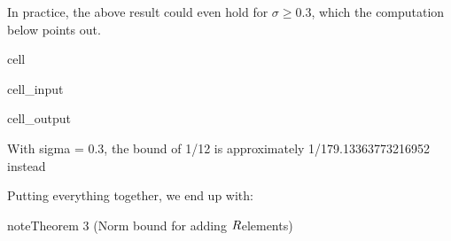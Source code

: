 \documentclass[letterpaper,10pt,english]{jupyterBook}
\begin{document}
\sphinxAtStartPar
In practice, the above result could even hold for \(\sigma \ge 0.3\), which the computation below points out.

\begin{sphinxuseclass}{cell}\begin{sphinxVerbatimInput}

\begin{sphinxuseclass}{cell_input}
\begin{sphinxVerbatim}[commandchars=\\\{\}]
   
     
   
  \PYG{p}{[}       \PYG{p}{]}
  
\end{sphinxVerbatim}

\end{sphinxuseclass}\end{sphinxVerbatimInput}
\begin{sphinxVerbatimOutput}

\begin{sphinxuseclass}{cell_output}
\begin{sphinxVerbatim}[commandchars=\\\{\}]
With sigma = 0.3, the bound of 1/12 is approximately 1/179.13363773216952 instead
\end{sphinxVerbatim}

\end{sphinxuseclass}\end{sphinxVerbatimOutput}

\end{sphinxuseclass}
\sphinxAtStartPar
Putting everything together, we end up with:
\label{Thesis:norm-bound-adding_R}
\begin{sphinxadmonition}{note}{Theorem 3 (Norm bound for adding \protect\(R\protect\)\sphinxhyphen{}elements)}
\end{sphinxadmonition}
\end{document}
